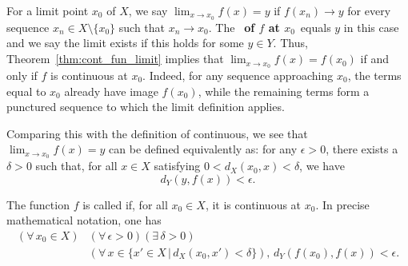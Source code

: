 \begin{definition} \label{def:cont_limit}
For a limit point $x_0$ of $X$, we say $\lim_{x\to x_0}f(x)=y$ if $f(x_n)\to y$ for every sequence $x_n \in X \setminus\{x_0\}$ such that $x_n\to x_0$.
The \boldmath%
~\textbf{of $f$ at $x_0$}\unboldmath~equals $y$ in this case and we say the limit exists if this holds for some $y\in Y$.
Thus, Theorem~\ref{thm:cont_fun_limit} implies that $\lim_{x\to x_0} f(x)=f(x_0)$ if and only if $f$ is continuous at $x_0$.
Indeed, for any sequence approaching $x_0$, the terms equal to $x_0$ already have image $f(x_0)$, while the remaining terms form a punctured sequence to which the limit definition applies.
\end{definition}


\begin{remark}
Comparing this with the definition of continuous, we see that $\lim_{x\to x_0} f(x)=y$ can be defined equivalently as:
for any $\epsilon> 0$, there exists a $\delta >0$ such that, for all $x\in X$ satisfying $0 < d_X(x_0,x) < \delta$, we have
\[ d_Y \left( y,f(x) \right) < \epsilon .\]
\end{remark}



\begin{definition}
The function $f$ is called  if, for all $x_0 \in X$, it is continuous at $x_0$.
In precise mathematical notation, one has
\begin{equation*}
\begin{split}
(\forall \, x_0 \in X) & (\forall \, \epsilon >0) ( \exists \, \delta >0) \\ & (\forall \, x \in \{x'\in X\,|\,d_X (x_0,x')<\delta\}), \,
  d_Y \left( f(x_0),f(x) \right) < \epsilon .
\end{split}
\end{equation*}
\end{definition}

